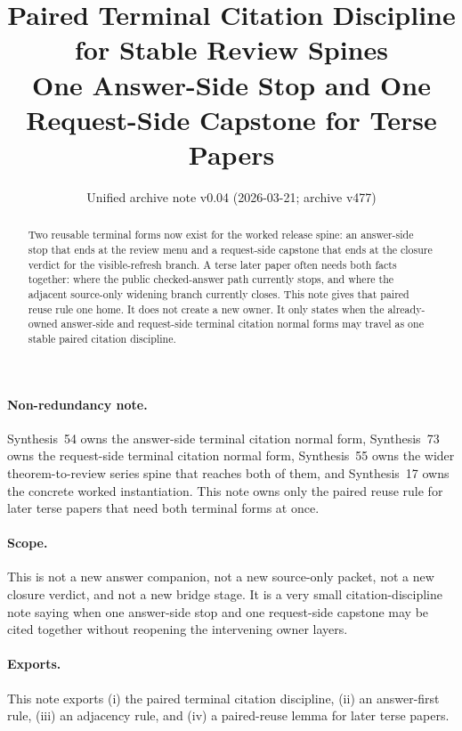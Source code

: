 \documentclass[11pt]{article}
\title{Paired Terminal Citation Discipline for Stable Review Spines\\
\large One Answer-Side Stop and One Request-Side Capstone for Terse Papers}
\author{}
\date{Unified archive note v0.04 (2026-03-21; archive v477)}
\begin{document}
\maketitle

\begin{abstract}
Two reusable terminal forms now exist for the worked release spine: an answer-side stop that ends at the review menu and a request-side capstone that ends at the closure verdict for the visible-refresh branch.
A terse later paper often needs both facts together: where the public checked-answer path currently stops, and where the adjacent source-only widening branch currently closes.
This note gives that paired reuse rule one home.
It does not create a new owner.
It only states when the already-owned answer-side and request-side terminal citation normal forms may travel as one stable paired citation discipline.
\end{abstract}

\paragraph{Non-redundancy note.}
Synthesis~54 owns the answer-side terminal citation normal form, Synthesis~73 owns the request-side terminal citation normal form, Synthesis~55 owns the wider theorem-to-review series spine that reaches both of them, and Synthesis~17 owns the concrete worked instantiation.\cite{series:challengeanswerreviewmenus,series:publicrequestresponsepacketrefreshresponsepacketclosureverdicts,series:seriesspines,series:workedexample}
This note owns only the paired reuse rule for later terse papers that need both terminal forms at once.

\paragraph{Scope.}
This is not a new answer companion, not a new source-only packet, not a new closure verdict, and not a new bridge stage.
It is a very small citation-discipline note saying when one answer-side stop and one request-side capstone may be cited together without reopening the intervening owner layers.

\paragraph{Exports.}
This note exports (i) the paired terminal citation discipline, (ii) an answer-first rule, (iii) an adjacency rule, and (iv) a paired-reuse lemma for later terse papers.
\end{document}
